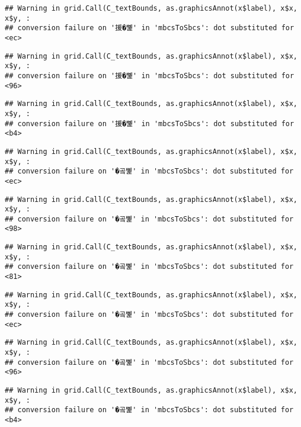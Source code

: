 \documentclass[
]{article}
\begin{document}
\begin{verbatim}
## Warning in grid.Call(C_textBounds, as.graphicsAnnot(x$label), x$x, x$y, :
## conversion failure on '援�뼱' in 'mbcsToSbcs': dot substituted for <ec>
\end{verbatim}

\begin{verbatim}
## Warning in grid.Call(C_textBounds, as.graphicsAnnot(x$label), x$x, x$y, :
## conversion failure on '援�뼱' in 'mbcsToSbcs': dot substituted for <96>
\end{verbatim}

\begin{verbatim}
## Warning in grid.Call(C_textBounds, as.graphicsAnnot(x$label), x$x, x$y, :
## conversion failure on '援�뼱' in 'mbcsToSbcs': dot substituted for <b4>
\end{verbatim}

\begin{verbatim}
## Warning in grid.Call(C_textBounds, as.graphicsAnnot(x$label), x$x, x$y, :
## conversion failure on '�곸뼱' in 'mbcsToSbcs': dot substituted for <ec>
\end{verbatim}

\begin{verbatim}
## Warning in grid.Call(C_textBounds, as.graphicsAnnot(x$label), x$x, x$y, :
## conversion failure on '�곸뼱' in 'mbcsToSbcs': dot substituted for <98>
\end{verbatim}

\begin{verbatim}
## Warning in grid.Call(C_textBounds, as.graphicsAnnot(x$label), x$x, x$y, :
## conversion failure on '�곸뼱' in 'mbcsToSbcs': dot substituted for <81>
\end{verbatim}

\begin{verbatim}
## Warning in grid.Call(C_textBounds, as.graphicsAnnot(x$label), x$x, x$y, :
## conversion failure on '�곸뼱' in 'mbcsToSbcs': dot substituted for <ec>
\end{verbatim}

\begin{verbatim}
## Warning in grid.Call(C_textBounds, as.graphicsAnnot(x$label), x$x, x$y, :
## conversion failure on '�곸뼱' in 'mbcsToSbcs': dot substituted for <96>
\end{verbatim}

\begin{verbatim}
## Warning in grid.Call(C_textBounds, as.graphicsAnnot(x$label), x$x, x$y, :
## conversion failure on '�곸뼱' in 'mbcsToSbcs': dot substituted for <b4>
\end{verbatim}
\end{document}
